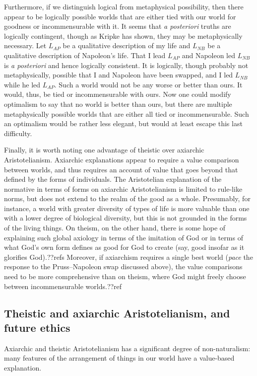 Furthermore, if we distinguish logical from metaphysical possibility, then there appear to be logically
possible worlds that are either tied with our world for goodness or incommensurable with it. It seems
that \textit{a posteriori} truths are logically contingent, though as Kripke has shown, they may be
metaphysically necessary. Let $L_{AP}$ be a qualitative description of my life and $L_{NB}$ be a qualitative
description of Napoleon's life. That I lead $L_{AP}$ and Napoleon led $L_{NB}$ is \textit{a posteriori} and
hence logically consistent. It is logically, though probably not metaphysically, possible that I and Napoleon
have been swapped, and I led $L_{NB}$ while he led $L_{AP}$. Such a world would not be any worse or better than
ours. It would, thus, be tied or incommensurable with ours. Now one could modify optimalism to say that
no world is better than ours, but there are multiple metaphysically possible worlds that are either all tied
or incommensurable. Such an optimalism would be rather less elegant, but would at least escape this last difficulty.	

Finally, it is worth noting one advantage of theistic over axiarchic Aristotelianism. Axiarchic explanations 
appear to require a value comparison between worlds, and thus requires an account of value that goes beyond 
that defined by the forms of individuals. The Aristotelian explanation of the normative in terms of forms on
axiarchic Aristotelianism is limited to rule-like norms, but does not extend to the realm of the good as a whole.
Presumably, for instance, a world with greater diversity of types of life is more valuable than one with a lower
degree of biological diversity, but this is not grounded in the forms of the living things. On theism, on the other 
hand, there is some hope of explaining such global axiology in terms of the imitation of God or in terms of what
God's own form defines as good for God to create (say, good insofar as it glorifies God).??refs Moreover, if
axiarchism requires a single best world (\textit{pace} the response to the Pruss--Napoleon swap discussed
above), the value comparisons need to be more comprehensive than on theism,
where God might freely choose between incommensurable worlds.??ref

\subsection{Theistic and axiarchic Aristotelianism, and future ethics}
Axiarchic and theistic Aristotelianism has a significant degree of non-naturalism: many features of the arrangement
of things in our world have a value-based explanation. 

